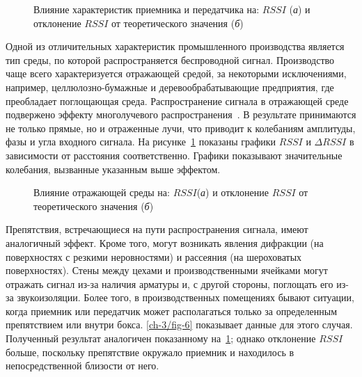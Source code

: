 \begin{figure}[!htb]
	\centering
	\caption[Влияние характеристик приемника и передатчика на RSSI и отклонение $RSSI$ от теоретического значения]{Влияние характеристик приемника и передатчика на: $RSSI$ (\textit{а}) и отклонение $RSSI$ от теоретического значения (\textit{б})}
\end{figure}

Одной из отличительных характеристик промышленного производства является тип среды, по которой распространяется беспроводной сигнал. Производство чаще всего характеризуется отражающей средой, за некоторыми исключениями, например, целлюлозно-бумажные и деревообрабатывающие предприятия, где преобладает поглощающая среда. Распространение сигнала в отражающей среде подвержено эффекту многолучевого распространения~\cite{7433518}. В результате принимаются не только прямые, но и отраженные лучи, что приводит к колебаниям амплитуды, фазы и угла входного сигнала. На рисунке~\cref{ch-3/fig-5} показаны графики $RSSI$ и $\Delta RSSI$ в зависимости от расстояния соответственно. Графики показывают значительные колебания, вызванные указанным выше эффектом.

\begin{figure} [tb]
	\caption{Влияние отражающей среды на: $RSSI$(\textit{а}) и отклонение $RSSI$ от теоретического значения (\textit{б})}
	\label{ch-3/fig-5}
\end{figure}

Препятствия, встречающиеся на пути распространения сигнала, имеют аналогичный эффект. Кроме того, могут возникать явления дифракции (на поверхностях с резкими неровностями) и рассеяния (на шероховатых поверхностях). Стены между цехами и производственными ячейками могут отражать сигнал из-за наличия арматуры и, с другой стороны, поглощать его из-за звукоизоляции. Более того, в производственных помещениях бывают ситуации, когда приемник или передатчик может располагаться только за определенным препятствием или внутри бокса. \cref{ch-3/fig-6} показывает данные для этого случая. Полученный результат аналогичен показанному на~\cref{ch-3/fig-5}; однако отклонение $RSSI$ больше, поскольку препятствие окружало приемник и находилось в непосредственной близости от него.

